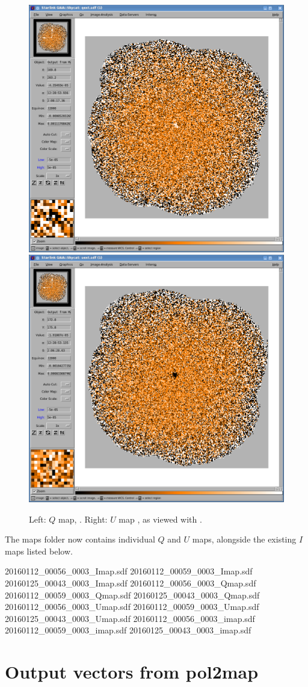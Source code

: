 \begin{figure}[t!]
\begin{center}
\includegraphics[width=0.46\linewidth]{sc22-gaia-view-qext.png}
\includegraphics[width=0.46\linewidth]{sc22-gaia-view-uext.png}
\label{fig:gaia-qext-uext}
\caption [Q and U maps in GAIA]{
  \small Left: $Q$ map, . Right: $U$ map , as viewed with \GAIA.
}
\end{center}
\end{figure}



The maps folder now contains individual $Q$ and $U$ maps, alongside the
existing $I$ maps listed below.

\begin{terminalv}
20160112_00056_0003_Imap.sdf  20160112_00059_0003_Imap.sdf  20160125_00043_0003_Imap.sdf
20160112_00056_0003_Qmap.sdf  20160112_00059_0003_Qmap.sdf  20160125_00043_0003_Qmap.sdf
20160112_00056_0003_Umap.sdf  20160112_00059_0003_Umap.sdf  20160125_00043_0003_Umap.sdf
20160112_00056_0003_imap.sdf  20160112_00059_0003_imap.sdf  20160125_00043_0003_imap.sdf
\end{terminalv}




\section{Output vectors from pol2map}



